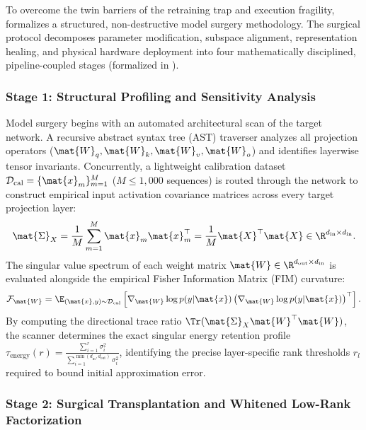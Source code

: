 To overcome the twin barriers of the retraining trap and execution fragility, \neuralops{} formalizes a structured, non-destructive model surgery methodology.
The surgical protocol decomposes parameter modification, subspace alignment, representation healing, and physical hardware deployment into four mathematically disciplined, pipeline-coupled stages (formalized in ).

\subsubsection{Stage 1: Structural Profiling and Sensitivity Analysis}
\label{subsubsec:stage1_profiling}

Model surgery begins with an automated architectural scan of the target network.
A recursive abstract syntax tree (AST) traverser analyzes all projection operators ($\mat{W}_q, \mat{W}_k, \mat{W}_v, \mat{W}_o$) and identifies layerwise tensor invariants.
Concurrently, a lightweight calibration dataset $\mathcal{D}_{\text{cal}} = \{\mat{x}_m\}_{m=1}^M$ ($M \le 1{,}000$ sequences) is routed through the network to construct empirical input activation covariance matrices across every target projection layer:
\begin{equation}
\label{eq:activation_covariance_def}
\mat{\Sigma}_X = \frac{1}{M} \sum_{m=1}^M \mat{x}_m \mat{x}_m^\top = \frac{1}{M} \mat{X}^\top \mat{X} \in \R^{d_{\text{in}} \times d_{\text{in}}}.
\end{equation}
The singular value spectrum of each weight matrix $\mat{W} \in \R^{d_{\text{out}} \times d_{\text{in}}}$ is evaluated alongside the empirical Fisher Information Matrix (FIM) curvature:
\begin{equation}
\label{eq:fim_curvature_def}
\mathcal{F}_{\mat{W}} = \E_{(\mat{x}, y) \sim \mathcal{D}_{\text{cal}}} \left[ \nabla_{\mat{W}} \log p(y|\mat{x}) \left(\nabla_{\mat{W}} \log p(y|\mat{x})\right)^\top \right].
\end{equation}
By computing the directional trace ratio $\Tr(\mat{\Sigma}_X \mat{W}^\top \mat{W})$, the scanner determines the exact singular energy retention profile $\tau_{\text{energy}}(r) = \frac{\sum_{i=1}^r \sigma_i^2}{\sum_{i=1}^{\min(d_{\text{in}}, d_{\text{out}})} \sigma_i^2}$, identifying the precise layer-specific rank thresholds $r_l$ required to bound initial approximation error.

\subsubsection{Stage 2: Surgical Transplantation and Whitened Low-Rank Factorization}
\label{subsubsec:stage2_transplantation}

